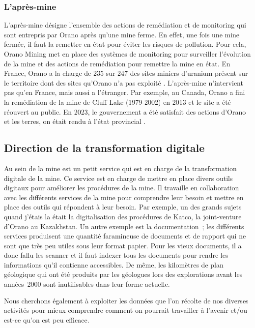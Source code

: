 \subsubsection{L'après-mine}
L'après-mine désigne l'ensemble des actions de remédiation et de monitoring qui sont entrepris par Orano après qu'une mine ferme. En effet, une fois une mine fermée, il faut la remettre en état pour éviter les risques de pollution. Pour cela, Orano Mining met en place des systèmes de monitoring pour surveiller l'évolution de la mine et des actions de remédiation pour remettre la mine en état. En France, Orano a la charge de 235 sur 247 des sites miniers d'uranium présent sur le territoire dont des sites qu'Orano n'a pas exploité \cite{site:orano_apres_mine}. L'après-mine n'intervient pas qu'en France, mais aussi a l'étranger. Par exemple, au Canada, Orano a fini la remédiation de la mine de Cluff Lake (1979-2002) en 2013 et le site a été réouvert au public. En 2023, le gouvernement a été satisfait des actions d'Orano et les terres, on était rendu à l'état provincial \cite{site:Cluff_lake_remediation}.

\subsection{Direction de la transformation digitale}
Au sein de la mine est un petit service qui est en charge de la transformation digitale de la mine. Ce service est en charge de mettre en place divers outils digitaux pour améliorer les procédures de la mine. Il travaille en collaboration avec les différents services de la mine pour comprendre leur besoin et mettre en place des outils qui répondent à leur besoin. Par exemple, un des grands sujets quand j'étais la était la digitalisation des procédures de Katco, la joint-venture d'Orano au Kazakhstan. Un autre exemple est la documentation~; les différents services produisent une quantité faramineuse de documents et de rapport qui ne sont que très peu utiles sous leur format papier. Pour les vieux documents, il a donc fallu les scanner et il faut indexer tous les documents pour rendre les informations qu'il contienne accessibles. De même, les kilomètres de plan géologique qui ont été produits par les géologues lors des explorations avant les années~2000 sont inutilisables dans leur forme actuelle.

Nous cherchons également à exploiter les données que l'on récolte de nos diverses activités pour mieux comprendre comment on pourrait travailler à l'avenir et/ou est-ce qu’on est peu efficace.

